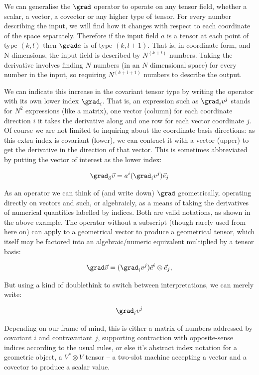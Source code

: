 We can generalise the $\grad$ operator to operate on any tensor field, whether a scalar, a vector, a covector or any higher type of tensor. For every number describing the input, we will find how it changes with respect to each coordinate of the space separately. Therefore if the input field $a$ is a tensor at each point of type $(k, l)$ then $\grad a$ is of type $(k, l + 1)$. That is, in coordinate form, and N dimensions, the input field is described by $N^{(k+l)}$ numbers. Taking the derivative involves finding $N$ numbers (in an $N$ dimensional space) for every number in the input, so requiring $N^{(k+l+1)}$ numbers to describe the output.

We can indicate this increase in the covariant tensor type by writing the operator with its own lower index $\grad_i$. That is, an expression such as $\grad_i v^j$ stands for $N^2$ expressions (like a matrix), one vector (column) for each coordinate direction $i$ it takes the derivative along and one row for each vector coordinate $j$. Of course we are not limited to inquiring about the coordinate basis directions: as this extra index is covariant (lower), we can contract it with a vector (upper) to get the derivative in the direction of that vector. This is sometimes abbreviated by putting the vector of interest as the lower index:

$$
\grad_{\vec{a}} \vec{v} = a^i (\grad_i v^j) \vec{e}_j
$$

As an operator we can think of (and write down) $\grad$ geometrically, operating directly on vectors and such, or algebraicly, as a means of taking the derivatives of numerical quantities labelled by indices. Both are valid notations, as shown in the above example. The operator without a subscript (though rarely used from here on) can apply to a geometrical vector to produce a geometrical tensor, which itself may be factored into an algebraic/numeric equivalent multiplied by a tensor basis:

$$
\grad \vec{v} = (\grad_i v^j) \vec{e}^i \otimes \vec{e}_j,
$$

But using a kind of doublethink to switch between interpretations, we can merely write:

$$
\grad_i v^j
$$

Depending on our frame of mind, this is either a matrix of numbers addressed by covariant $i$ and contravariant $j$, supporting contraction with opposite-sense indices according to the usual rules, or else it's abstract index notation for a geometric object, a $V^* \otimes V$ tensor -- a two-slot machine accepting a vector and a covector to produce a scalar value.

